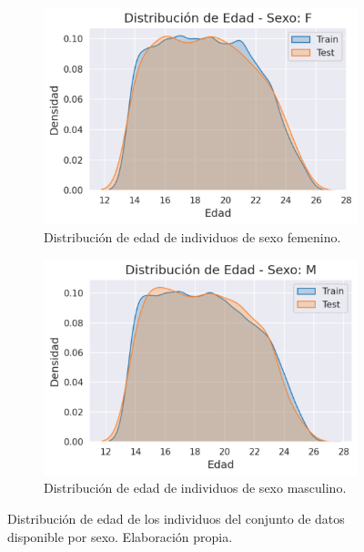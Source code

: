 \begin{figure}[h]
    \centering

    \begin{subfigure}[b]{0.47\textwidth}
        \centering
        \includegraphics[width=\textwidth]{capitulos/cap_04/imagenes/kde_ages_F.png}
        \caption{Distribución de edad de individuos de sexo femenino.}
        \label{fig:kde_ages_F}
    \end{subfigure}
    \hfill
    \begin{subfigure}[b]{0.47\textwidth}
        \centering
        \includegraphics[width=\textwidth]{capitulos/cap_04/imagenes/kde_ages_M.png}
        \caption{Distribución de edad de individuos de sexo masculino.}
        \label{fig:kde_ages_M}
    \end{subfigure}

    \caption[
        Distribución de edad de los individuos del conjunto de datos disponible por sexo.
    ]{
        Distribución de edad de los individuos del conjunto de datos disponible por sexo. 
        Elaboración propia.
    }
    \label{fig:kde_ages_train_test}
\end{figure}


